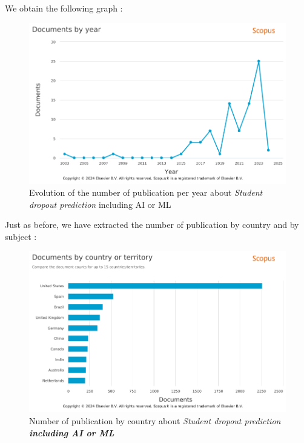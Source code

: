 \documentclass[../../main.tex]{subfiles}
\begin{document}
We obtain the following graph :
\begin{figure}[H]
    \centering
    \includegraphics[width=1\linewidth]{res//graph/prediction student with AI/PredictingStudentDropoutW_AI_ML.png}
    \caption{Evolution of the number of publication per year about \textit{Student dropout prediction} including AI or ML}
    \label{fig:nb_pub_scopus_predictstudent_AI}
\end{figure}

Just as before, we have extracted the number of publication by country and by subject :
\begin{figure}[H]
    \centering
    \includegraphics[width=1\linewidth]{res//graph/prediction student with AI/Scopus-Analyze-Country.png}
    \caption{Number of publication by country about \textit{Student dropout prediction \textbf{including AI or ML}}}
    \label{fig:nb_pub_scopus_predictstudent_country}
\end{figure}
\end{document}
